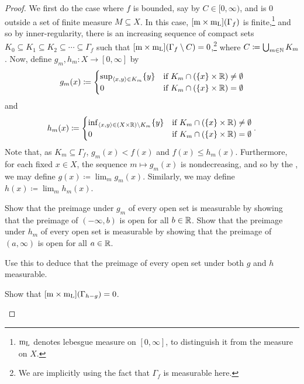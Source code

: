 \begin{prp}
\begin{proof}
We first do the case where $f$ is bounded, say by $C\in [0,\infty )$, and is $0$ outside a set of finite measure $M\subseteq X$.  In this case, $[\mathrm{m} \times \mathrm{m} _{\mathrm{L}}](\Gamma _f)$ is finite,\footnote{$\mathrm{m} _{\mathrm{L}}$ denotes lebesgue measure on $[0,\infty ]$, to distinguish it from the measure on $X$.} and so by inner-regularity, there is an increasing sequence of compact sets $K_0\subseteq K_1\subseteq K_2\subseteq \cdots \subseteq \Gamma _f$ such that $[\mathrm{m} \times \mathrm{m} _{\mathrm{L}}](\Gamma _f\setminus C)=0$,\footnote{We are implicitly using the fact that $\Gamma _f$ is measurable here.} where $C\coloneqq \bigcup _{m\in \mathbb{N}}K_m$.  Now, define $g_m,h_m:X\rightarrow [0,\infty ]$ by
\begin{equation}
g_m(x)\coloneqq \begin{cases}\sup _{\langle x,y\rangle\in K_m}\{ y\} & \text{if }K_m\cap (\{ x\} \times \mathbb{R} )\neq \emptyset \\ 0 & \text{if }K_m\cap (\{ x\} \times \mathbb{R} )=\emptyset \end{cases}
\end{equation}
and
\begin{equation}
h_m(x)\coloneqq \begin{cases}\inf _{\langle x,y\rangle\in (X\times \mathbb{R} )\setminus K_m}\{ y\} & \text{if }K_m\cap (\{ x\} \times \mathbb{R} )\neq \emptyset \\ 0 & \text{if }K_m\cap (\{ x\} \times \mathbb{R} )=\emptyset \end{cases}.
\end{equation}
Note that, as $K_m\subseteq \Gamma _f$, $g_m(x)<f(x)$ and $f(x)\leq h_m(x)$. Furthermore, for each fixed $x\in X$, the sequence $m\mapsto g_m(x)$ is nondecreasing, and so by the , we may define $g(x)\coloneqq \lim _mg_m(x)$.  Similarly, we may define $h(x)\coloneqq \lim _mh_m(x)$.
\begin{exr}
Show that the preimage under $g_m$ of every open set is measurable by showing that the preimage of $(-\infty ,b)$ is open for all $b\in \mathbb{R}$.  Show that the preimage under $h_m$ of every open set is measurable by showing that the preimage of $(a,\infty )$ is open for all $a\in \mathbb{R}$.
\end{exr}
\begin{exr}
Use this to deduce that the preimage of every open set under both $g$ and $h$ measurable.
\end{exr}
\begin{exr}
Show that $[\mathrm{m} \times \mathrm{m} _{\mathrm{L}}](\Gamma _{h-g})=0$.
\end{exr}

\end{proof}
\end{prp}
